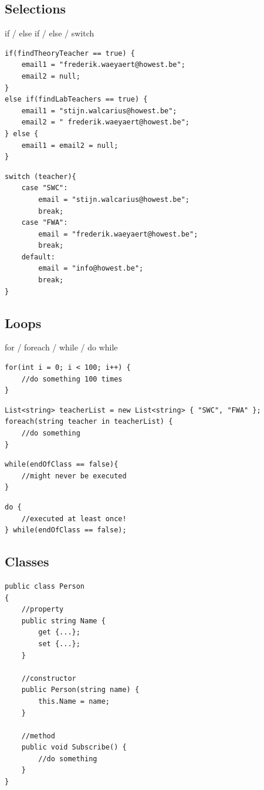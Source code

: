 \documentclass{article}
\begin{document}
\subsection{Selections}
if / else if / else / switch

\begin{verbatim}
if(findTheoryTeacher == true) {
    email1 = "frederik.waeyaert@howest.be";
    email2 = null;
}
else if(findLabTeachers == true) {
    email1 = "stijn.walcarius@howest.be";
    email2 = " frederik.waeyaert@howest.be";
} else {
    email1 = email2 = null;
}
\end{verbatim}

\begin{verbatim}
switch (teacher){
    case "SWC":
        email = "stijn.walcarius@howest.be";
        break;
    case "FWA":
        email = "frederik.waeyaert@howest.be";
        break;
    default:
        email = "info@howest.be";
        break;
}
\end{verbatim}

\subsection{Loops}
for / foreach / while / do while

\begin{verbatim}
for(int i = 0; i < 100; i++) {
    //do something 100 times
}
\end{verbatim}

\begin{verbatim}
List<string> teacherList = new List<string> { "SWC", "FWA" };
foreach(string teacher in teacherList) {
    //do something
}
\end{verbatim}

\begin{verbatim}
while(endOfClass == false){
    //might never be executed
}
\end{verbatim}

\begin{verbatim}
do {
    //executed at least once!
} while(endOfClass == false);
\end{verbatim}

\subsection{Classes}
\begin{verbatim}
public class Person
{
    //property
    public string Name { 
        get {...};
        set {...}; 
    }

    //constructor
    public Person(string name) {
        this.Name = name;
    }

    //method
    public void Subscribe() {
        //do something
    }
}
\end{verbatim}
\end{document}
